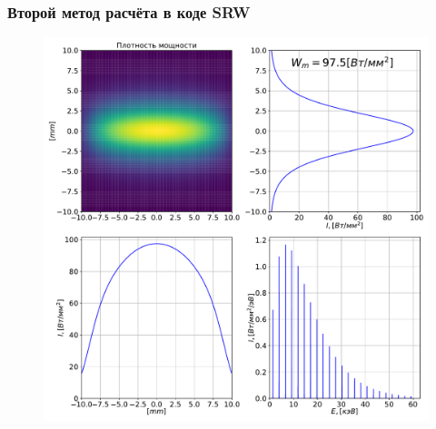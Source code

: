 \documentclass[14pt, hyperref = {colorlinks},xcolor=table ]{beamer}
\begin{document}
\small
\begin{frame}
\frametitle{Второй метод расчёта в коде SRW}\label{t1}
\vspace{-10pt}
\begin{figure}[h]
	\begin{minipage}[h]{0.65\linewidth}
		\vspace{-0pt}
		\includegraphics[width=1.0\linewidth]{pic/power_dens_1-1.pdf}
	\end{minipage}	
	\end{figure}
\end{frame}
\end{document}
